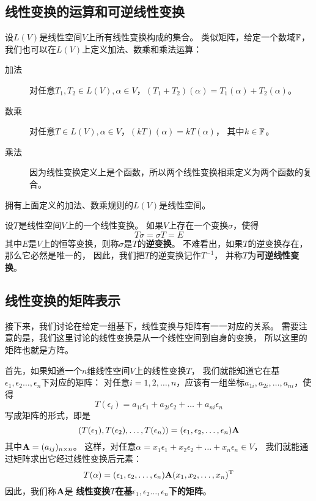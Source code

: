 \subsection{线性变换的运算和可逆线性变换}
设$L(V)$是线性空间$V$上所有线性变换构成的集合。
类似矩阵，给定一个数域$\mathbb{F}$，
我们也可以在$L(V)$上定义加法、数乘和乘法运算：
\begin{description}
  \item[加法]
  对任意$T_1,T_2\in L(V),\alpha\in V$，$(T_1+T_2)(\alpha)=T_1(\alpha)+T_2(\alpha)$。
  \item[数乘]
  对任意$T\in L(V),\alpha\in V$，$(kT)(\alpha)=kT(\alpha)$，
  其中$k\in\mathbb{F}$。
  \item[乘法]
  因为线性变换定义上是个函数，所以两个线性变换相乘定义为两个函数的复合。
\end{description}

\begin{theorem}
  拥有上面定义的加法、数乘规则的$L(V)$是线性空间。
\end{theorem}

\begin{definition}[可逆线性变换]
  设$T$是线性空间$V$上的一个线性变换。
  如果$V$上存在一个变换$\sigma$，使得
  \[ T\sigma = \sigma T = E \]
  其中$E$是$V$上的恒等变换，则称$\sigma$是$T$的\textbf{逆变换}。
  不难看出，如果$T$的逆变换存在，那么它必然是唯一的，
  因此，我们把$T$的逆变换记作$T^{-1}$，
  并称$T$为\textbf{可逆线性变换}。
\end{definition}

\subsection{线性变换的矩阵表示}
接下来，我们讨论在给定一组基下，线性变换与矩阵有一一对应的关系。
需要注意的是，我们这里讨论的线性变换是从一个线性空间到自身的变换，
所以这里的矩阵也就是方阵。

首先，如果知道一个$n$维线性空间$V$上的线性变换$T$，
我们就能知道它在基$\epsilon_1,\epsilon_2\dots,\epsilon_n$下对应的矩阵：
对任意$i=1,2,\dots,n$，应该有一组坐标$a_{1i},a_{2i},\dots,a_{ni}$，使得
\begin{displaymath}
  T(\epsilon_i) = a_{1i}\epsilon_1+a_{2i}\epsilon_2+\dots+a_{ni}\epsilon_n
\end{displaymath}
写成矩阵的形式，即是
\begin{displaymath}
  (T(\epsilon_1), T(\epsilon_2),\dots,T(\epsilon_n)) =
    (\epsilon_1,\epsilon_2,\dots,\epsilon_n)\mathbf{A}
\end{displaymath}
其中$\mathbf{A}=(a_{ij})_{n\times n}$。
这样，对任意$\alpha=x_1\epsilon_1+x_2\epsilon_2+\dots+x_n\epsilon_n\in V$，
我们就能通过矩阵求出它经过线性变换后元素：
\begin{equation} \label{eq:coord-after-linear-trans}
  T(\alpha) = (\epsilon_1,\epsilon_2,\dots,\epsilon_n)\mathbf{A}
    (x_1,x_2,\dots,x_n)^{\textrm{T}}
\end{equation}
因此，我们称$\mathbf{A}$是
\textbf{线性变换$T$在基$\epsilon_1,\epsilon_2\dots,\epsilon_n$下的矩阵}。

